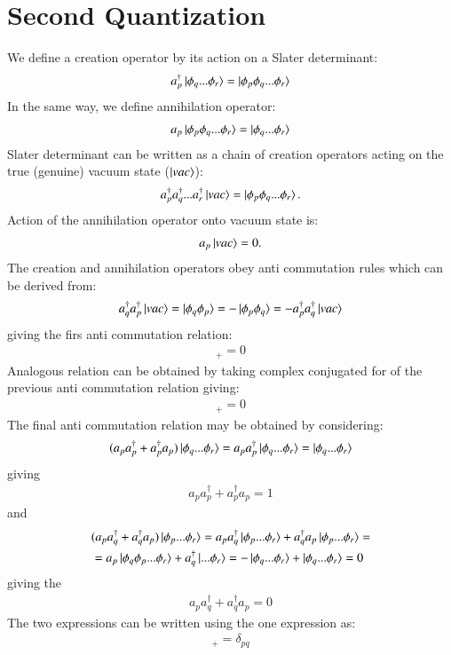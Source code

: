 \documentclass[journal=jacsat]{achemso}
\numberwithin{equation}{section}
\begin{document}
\section{Second Quantization}
We define a creation operator by its action on a Slater determinant:
 \begin{align}
a_{p}^{\dagger}\ket{\phi_{q}...\phi_{r}}=\ket{\phi_{p}\phi_{q}...\phi_{r}}
\end{align} 
In the same way, we define annihilation operator: 
\begin{align}
a_{p}\ket{\phi_{p}\phi_{q}...\phi_{r}}=\ket{\phi_{q}...\phi_{r}}
\end{align} 
Slater determinant can be written as a chain of creation operators acting on the true (genuine) vacuum state ($\ket{vac}$):
\begin{align}
a_{p}^{\dagger}a_{q}^{\dagger}...a_{r}^{\dagger}\ket{vac}=\ket{\phi_{p}\phi_{q}...\phi_{r}}.
\end{align} 
Action of the annihilation operator onto vacuum state is:
\begin{align}
a_{p}\ket{vac}=0.
\end{align} 
The creation and annihilation operators obey anti commutation rules which can be derived from:
\begin{align}
a_{q}^{\dagger}a_{p}^{\dagger}\ket{vac}=\ket{\phi_{q}\phi_{p}}=-\ket{\phi_{p}\phi_{q}}=-a_{p}^{\dagger}a_{q}^{\dagger}\ket{vac}
\end{align} 
giving the firs anti commutation relation:
\begin{align}
[a_{q}^{\dagger},a_{p}^{\dagger}]_{+}=0
\end{align} 
Analogous relation can be obtained by taking complex conjugated for of the previous anti commutation relation giving:
\begin{align}
[a_{q},a_{p}]_{+}=0
\end{align} 
The final anti commutation relation may be obtained by considering:
\begin{align}
(a_{p}a_{p}^{\dagger}+a_{p}^{\dagger}a_{p})\ket{\phi_{q}...\phi_{r}}=a_{p}a_{p}^{\dagger}\ket{\phi_{q}...\phi_{r}}=\ket{\phi_{q}...\phi_{r}}
\end{align} 
giving
\begin{align}
a_{p}a_{p}^{\dagger}+a_{p}^{\dagger}a_{p}=1
\end{align} 
and 
\begin{align}
&(a_{p}a_{q}^{\dagger}+a_{q}^{\dagger}a_{p})\ket{\phi_{p}...\phi_{r}}=a_{p}a_{q}^{\dagger}\ket{\phi_{p}...\phi_{r}}+a_{q}^{\dagger}a_{p}\ket{\phi_{p}...\phi_{r}}=\\
&=a_{p}\ket{\phi_{q}\phi_{p}...\phi_{r}}+a_{q}^{\dagger}\ket{...\phi_{r}}=-\ket{\phi_{q}...\phi_{r}}+\ket{\phi_{q}...\phi_{r}}=0
\end{align} 
giving the 
\begin{align}
a_{p}a_{q}^{\dagger}+a_{q}^{\dagger}a_{p}=0
\end{align} 
The two expressions can be written using the one expression as:
\begin{align}
[a_{p},a_{q}^{\dagger}]_{+}=\delta_{pq}
\end{align} 
\end{document}
